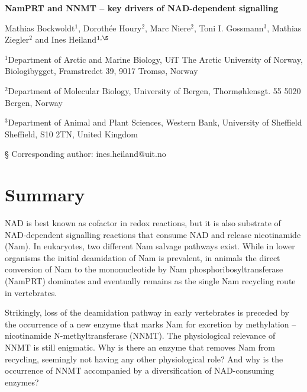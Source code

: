 \documentclass[paper=a4, 12pt]{scrartcl}
\begin{document}
\noindent
{\huge\sffamily\bfseries NamPRT and NNMT – key drivers of NAD-dependent signalling \par}

\vspace{15mm}

\noindent
Mathias Bockwoldt$^{1}$, Dorothée Houry$^{2}$,  Marc Niere$^{2}$, Toni I. Gossmann$^{3}$, Mathias Ziegler$^{2}$ and Ines Heiland$^{1,\S}$

\vspace{1cm}

\noindent
$^{1}$Department of Arctic and Marine Biology, UiT The Arctic University of Norway, Biologibygget, Framstredet 39, 9017 Tromsø, Norway

\noindent
$^{2}$Department of Molecular Biology, University of Bergen, Thormøhlensgt. 55
5020 Bergen, Norway

\noindent
$^{3}$Department of Animal and Plant Sciences, Western Bank, University of Sheffield
Sheffield, S10 2TN, United Kingdom

\noindent
§ Corresponding author: ines.heiland@uit.no


\section{Summary}

NAD is best known as cofactor in redox reactions, but it is also substrate of NAD-dependent signalling reactions that consume NAD and release nicotinamide (Nam). In eukaryotes, two different Nam salvage pathways exist. While in lower organisms the initial deamidation of Nam is prevalent, in animals the direct conversion of Nam to the mononucleotide by Nam phosphoribosyltransferase (NamPRT) dominates and eventually remains as the single Nam recycling route in vertebrates.

Strikingly, loss of the deamidation pathway in early vertebrates is preceded by the occurrence of a new enzyme that marks Nam for excretion by methylation – nicotinamide N-methyltransferase (NNMT). The physiological relevance of NNMT is still enigmatic. Why is there an enzyme that removes Nam from recycling, seemingly not having any other physiological role? And why is the occurrence of NNMT accompanied by a diversification of NAD-consuming enzymes?
\end{document}
